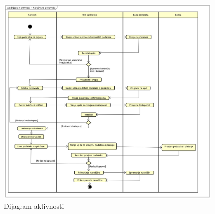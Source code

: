 		\begin{figure}[H]
			\includegraphics[width=\linewidth]{dijagrami/Dijagram_aktivnosti.png}
			\centering
			\caption{Dijagram aktivnosti }
			\label{fig:ClassDiagram1}
		\end{figure}
			
		
		
